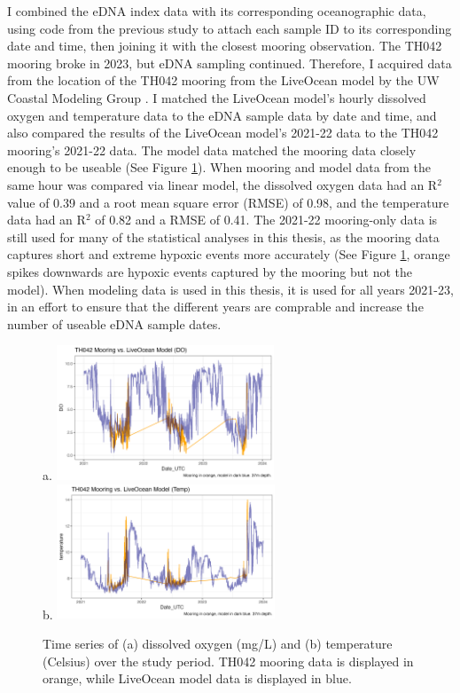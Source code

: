 \documentclass[12pt,twoside]{reedthesis}
\begin{document}
	I combined the eDNA index data with its corresponding oceanographic data, using code from the previous study to attach each sample ID to its corresponding date and time, then joining it with the closest mooring observation. The TH042 mooring broke in 2023, but eDNA sampling continued. Therefore, I acquired data from the location of the TH042 mooring from the LiveOcean model by the UW Coastal Modeling Group \autocite{Siedlecki2015a, Fatland2016, LiveOceanHomepage}. I matched the LiveOcean model's hourly dissolved oxygen and temperature data to the eDNA sample data by date and time, and also compared the results of the LiveOcean model's 2021-22 data to the TH042 mooring's 2021-22 data. The model data matched the mooring data closely enough to be useable (See Figure \ref{ModelComparison}). When mooring and model data from the same hour was compared via linear model, the dissolved oxygen data had an R$^2$ value of 0.39 and a root mean square error (RMSE) of 0.98, and the temperature data had an R$^2$ of 0.82 and a RMSE of 0.41. The 2021-22 mooring-only data is still used for many of the statistical analyses in this thesis, as the mooring data captures short and extreme hypoxic events more accurately (See Figure \ref{ModelComparison}, orange spikes downwards are hypoxic events captured by the mooring but not the model). When modeling data is used in this thesis, it is used for all years 2021-23, in an effort to ensure that the different years are comprable and increase the number of useable eDNA sample dates. 
	
	\begin{figure}
		\begin{center}
			a. \includegraphics[width=0.58\textwidth]{Mooring_vs_Model_DO_37} \\
			b. \includegraphics[width=0.58\textwidth]{Mooring_vs_Model_Temp_37}
			\caption[Mooring vs. Model]{Time series of (a) dissolved oxygen (mg/L) and (b) temperature (Celsius) over the study period. TH042 mooring data is displayed in orange, while LiveOcean model data is displayed in blue.} %
			\label{ModelComparison}
		\end{center}
	\end{figure} 
	
\end{document}
